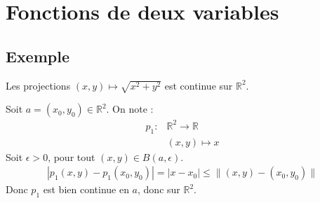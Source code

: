 \documentclass[../main.tex]{subfiles}
\begin{document}
\setcounter{chapter}{35}
\chapter{Fonctions de deux variables}
\tableofcontents
\clearpage

\section{Exemple}
\begin{tcolorbox}[title=Exemple 36.15, title filled=false, colframe=darkgreen, colback=darkgreen!10!white]
    Les projections $(x, y)\mapsto \sqrt{x^2 + y^2}$ est continue sur $\mathbb{R}^2$. 
\end{tcolorbox}

\noindent Soit $a = (x_0, y_0)\in \mathbb{R}^2$. On note : 
\begin{align*}
    p_1:&\mathbb{R}^2\to \mathbb{R} \\
    &(x, y)\mapsto x
\end{align*}
Soit $\epsilon > 0$, pour tout $(x, y)\in B(a, \epsilon)$. 
\begin{align*}
    |p_1(x, y) - p_1(x_0, y_0)| = |x - x_0| \leq \| (x, y) - (x_0, y_0)\|
\end{align*}
Donc $p_1$ est bien continue en $a$, donc sur $\mathbb{R}^2$. 
\end{document}
